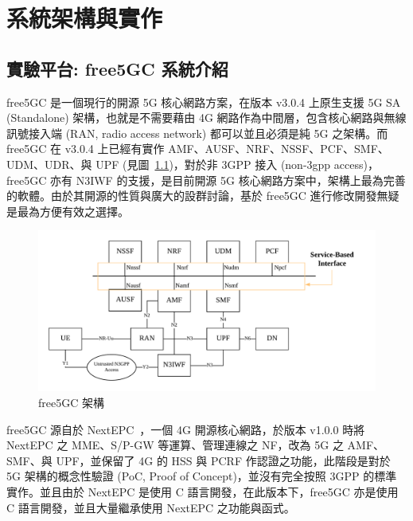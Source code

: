 \chapter{系統架構與實作}
\label{chapter:system}


\section{實驗平台: free5GC 系統介紹}
\label{sec:free5gc_intro}


free5GC 是一個現行的開源 5G 核心網路方案，在版本 v3.0.4 上原生支援 5G SA (Standalone) 架構，也就是不需要藉由 4G 網路作為中間層，包含核心網路與無線訊號接入端 (RAN, radio access network) 都可以並且必須是純 5G 之架構。而 free5GC 在 v3.0.4 上已經有實作 AMF、AUSF、NRF、NSSF、PCF、SMF、UDM、UDR、與 UPF (見圖~\ref{fig:free5gc_arch})，對於非 3GPP 接入 (non-3gpp access)，free5GC 亦有 N3IWF 的支援，是目前開源 5G 核心網路方案中，架構上最為完善的軟體。由於其開源的性質與廣大的設群討論，基於 free5GC 進行修改開發無疑是最為方便有效之選擇。

\begin{figure}[htbp]
    \centering
    \includegraphics[height=!,width=1\linewidth,keepaspectratio=true]{figures/free5gc-stage-2-arch}
    \caption[free5GC 架構]{{\footnotesize free5GC 架構~\cite{free5gc}}}
    \label{fig:free5gc_arch}
\end{figure}

free5GC 源自於 NextEPC~\cite{nextepc}，一個 4G 開源核心網路，於版本 v1.0.0 時將 NextEPC 之 MME、S/P-GW 等運算、管理連線之 NF，改為 5G 之 AMF、SMF、與 UPF，並保留了 4G 的 HSS 與 PCRF 作認證之功能，此階段是對於 5G 架構的概念性驗證 (PoC, Proof of Concept)，並沒有完全按照 3GPP 的標準實作。並且由於 NextEPC 是使用 C 語言開發，在此版本下，free5GC 亦是使用 C 語言開發，並且大量繼承使用 NextEPC 之功能與函式。

